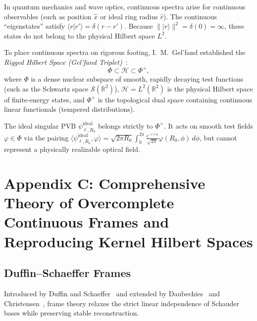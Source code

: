 \documentclass{optica-article}
\begin{document}
In quantum mechanics and wave optics, continuous spectra arise for continuous observables (such as position $\hat{x}$ or ideal ring radius $\hat{r}$). The continuous ``eigenstates'' satisfy $\langle r | r' \rangle = \delta(r - r')$. Because $\||r\rangle\|^2 = \delta(0) = \infty$, these states do not belong to the physical Hilbert space $L^2$.

To place continuous spectra on rigorous footing, I.~M.~Gel'fand established the \emph{Rigged Hilbert Space (Gel'fand Triplet)}~\cite{Gelfand1964,Bohm1989}:
\begin{equation}
\Phi \subset \mathcal{H} \subset \Phi^\times,
\label{eq:app_gelfand_triplet}
\end{equation}
where $\Phi$ is a dense nuclear subspace of smooth, rapidly decaying test functions (such as the Schwartz space $\mathcal{S}(\mathbb{R}^2)$), $\mathcal{H} = L^2(\mathbb{R}^2)$ is the physical Hilbert space of finite-energy states, and $\Phi^\times$ is the topological dual space containing continuous linear functionals (tempered distributions).

The ideal singular PVB $\psi_{\ell, R_0}^{\text{ideal}}$ belongs strictly to $\Phi^\times$. It acts on smooth test fields $\varphi \in \Phi$ via the pairing $\langle \psi_{\ell, R_0}^{\text{ideal}}, \varphi \rangle = \sqrt{2\pi R_0} \int_0^{2\pi} \frac{e^{-i \ell \phi}}{\sqrt{2\pi}} \varphi(R_0, \phi) \, d\phi$, but cannot represent a physically realizable optical field.

\section{Appendix C: Comprehensive Theory of Overcomplete Continuous Frames and Reproducing Kernel Hilbert Spaces}
\label{app:frames}

\subsection{Duffin--Schaeffer Frames}

Introduced by Duffin and Schaeffer~\cite{Duffin1952} and extended by Daubechies~\cite{Daubechies1990} and Christensen~\cite{Christensen2016}, frame theory relaxes the strict linear independence of Schauder bases while preserving stable reconstruction.
\end{document}
